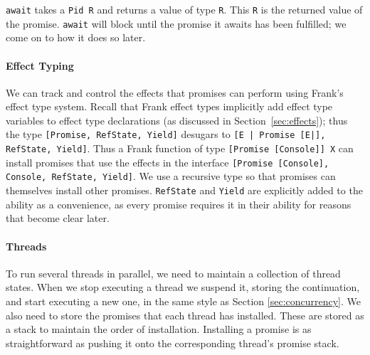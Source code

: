\documentclass[msc,deptreport,cs]{infthesis} %
\newcommand{\code}[1]{\lstinline{#1}}
\newcommand{\todo}[1]
           {{\par\noindent\small\color{RoyalPurple}
  \framebox{\parbox{\dimexpr\linewidth-2\fboxsep-2\fboxrule}
    {\textbf{TODO:} #1}}}}
\begin{document}
\code{await} takes a \code{Pid R} and returns a value of type \code{R}. This
\code{R} is the returned value of the promise. \code{await} will block until the
promise it awaits has been fulfilled; we come on to how it does so later.

\paragraph*{Effect Typing}





We can track and control the effects that promises can perform using Frank's
effect type system. Recall that Frank effect types implicitly add effect type
variables to effect type declarations (as discussed in
Section~\ref{sec:effects}); thus the type \code{[Promise, RefState, Yield]}
desugars to \code{[E | Promise [E|], RefState, Yield]}. Thus a Frank function of
type \code{[Promise [Console]] X} can install promises that use the effects in
the interface \code{[Promise [Console], Console, RefState, Yield]}. We use a
recursive type so that promises can themselves install other promises.
\code{RefState} and \code{Yield} are explicitly added to the ability as a
convenience, as every promise requires it in their ability for reasons that
become clear later.

\paragraph*{Threads}

To run several threads in parallel, we need to maintain a collection of thread
states. When we stop executing a thread we suspend it, storing the continuation,
and start executing a new one, in the same style as Section
\ref{sec:concurrency}. We also need to store the promises that each thread has
installed. These are stored as a stack to maintain the order of installation.
Installing a promise is as straightforward as pushing it onto the corresponding
thread's promise stack.
\end{document}
